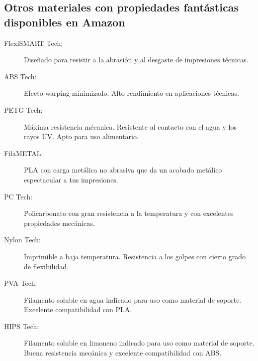 \documentclass[11pt,a4paper]{article}
\begin{document}
\subsection{Otros materiales con propiedades fantásticas disponibles en Amazon}
\begin{description}
\item[FlexiSMART Tech:] Diseñado para resistir a la abrasión y al desgaste de impresiones técnicas.
\item[ABS Tech:] Efecto warping minimizado. Alto rendimiento en aplicaciones técnicas.
\item[PETG Tech:] Máxima resistencia mécanica. Resistente al contacto con el agua y los rayos UV. Apto para uso alimentario.
\item[FilaMETAL:] PLA con carga metálica no abrasiva que da un acabado metálico espectacular a tus impresiones.
\item[PC Tech:] Policarbonato con gran resistencia a la temperatura y con excelentes propiedades mecánicas.
\item[Nylon Tech:] Imprimible a baja temperatura. Resistencia a los golpes con cierto grado de flexibilidad.
\item[PVA Tech:] Filamento soluble en agua indicado para uso como material de soporte. Excelente compatibilidad con PLA.
\item[HIPS Tech:] Filamento soluble en limoneno indicado para uso como material de soporte. Buena resistencia mecánica y excelente compatibilidad con ABS.
\end{description}

\end{document}
